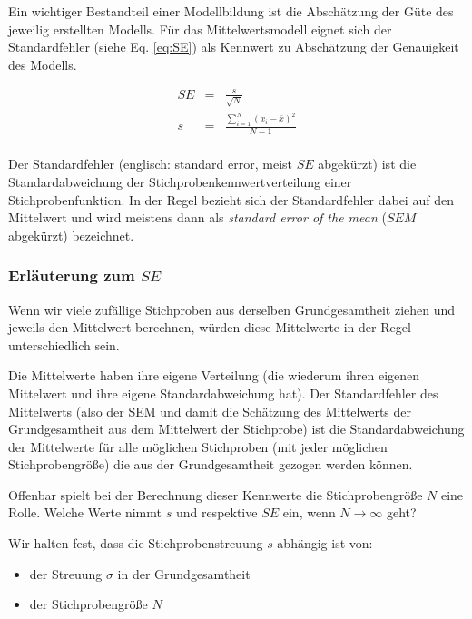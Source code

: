 \documentclass[]{article}
\providecommand{\tightlist}{%
  \setlength{\itemsep}{0pt}\setlength{\parskip}{0pt}}
\begin{document}
Ein wichtiger Bestandteil einer Modellbildung ist die Abschätzung der
Güte des jeweilig erstellten Modells. Für das Mittelwertsmodell eignet
sich der Standardfehler (siehe Eq. \eqref{eq:SE}) als Kennwert zu
Abschätzung der Genauigkeit des Modells.

\begin{eqnarray} 
  SE &=& \frac{s}{\sqrt{N}} \\
  s  &=& \frac{\sum_{i = 1}^{N} (x_i - \bar{x})^2}{N-1} \\
  \label{eq:SE}
\end{eqnarray}

Der Standardfehler (englisch: standard error, meist \(SE\) abgekürzt)
ist die Standardabweichung der Stichprobenkennwertverteilung einer
Stichprobenfunktion. In der Regel bezieht sich der Standardfehler dabei
auf den Mittelwert und wird meistens dann als \emph{standard error of
the mean} (\(SEM\) abgekürzt) bezeichnet.

\subsubsection*{\texorpdfstring{Erläuterung zum
\(SE\)}{Erläuterung zum SE}}\label{erlauterung-zum-se}

Wenn wir viele zufällige Stichproben aus derselben Grundgesamtheit
ziehen und jeweils den Mittelwert berechnen, würden diese Mittelwerte in
der Regel unterschiedlich sein.

Die Mittelwerte haben ihre eigene Verteilung (die wiederum ihren eigenen
Mittelwert und ihre eigene Standardabweichung hat). Der Standardfehler
des Mittelwerts (also der SEM und damit die Schätzung des Mittelwerts
der Grundgesamtheit aus dem Mittelwert der Stichprobe) ist die
Standardabweichung der Mittelwerte für alle möglichen Stichproben (mit
jeder möglichen Stichprobengröße) die aus der Grundgesamtheit gezogen
werden können.

Offenbar spielt bei der Berechnung dieser Kennwerte die Stichprobengröße
\(N\) eine Rolle. Welche Werte nimmt \(s\) und respektive \(SE\) ein,
wenn \(N \rightarrow \infty\) geht?

Wir halten fest, dass die Stichprobenstreuung \(s\) abhängig ist von:

\begin{itemize}
\tightlist
\item
  der Streuung \(\sigma\) in der Grundgesamtheit
\item
  der Stichprobengröße \(N\)
\end{itemize}
\end{document}

